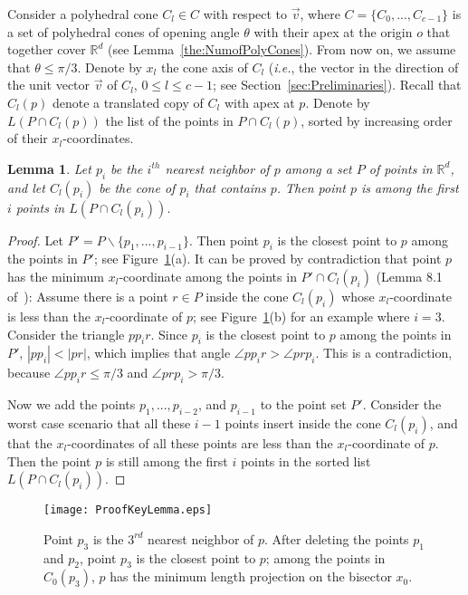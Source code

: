 \documentclass[preprint,12pt]{elsarticle}
\newcommand{\ie}{\emph{i.e.}}
\newtheorem{lemma}{Lemma}[section]
\begin{document}
Consider a polyhedral cone $C_l\in C$ with respect to $\overrightarrow{v}$, where  $C=\{C_0,...,C_{c-1}\}$ is a set of polyhedral cones of opening angle $\theta$ with their apex at the origin $o$ that together cover $\mathbb{R}^d$ (see Lemma~\ref{the:NumofPolyCones}). From now on, we assume that $\theta\leq \pi/3$. Denote by $x_l$ the cone axis of $C_l$ (\ie, the vector in the direction of the unit vector $\overrightarrow{v}$ of $C_l$, $0\leq l\leq c-1$; see Section~\ref{sec:Preliminaries}). Recall that $C_l(p)$ denote a translated copy of $C_l$ with apex at $p$. Denote by $L(P\cap C_l(p))$ the list of the points in $P\cap C_l(p)$, sorted by increasing order of their $x_l$-coordinates.

\begin{lemma}\label{the:keyLemma2}
Let $p_i$ be the $i^{th}$ nearest neighbor of $p$ among a set $P$ of points in $\mathbb{R}^d$, and let $C_{l}(p_i)$ be the cone of $p_i$ that contains $p$. Then point $p$ is among the first $i$ points in $L(P\cap C_l(p_i))$.
\end{lemma}
\begin{proof}
Let $P'=P\backslash \{p_1,...,p_{i-1}\}$. Then point $p_i$ is the closest point to $p$ among the points in $P'$; see Figure~\ref{fig:ProofKeyLemma}(a). It can be proved by contradiction that point $p$ has the minimum $x_l$-coordinate among the points in $P'\cap C_l(p_i)$ (Lemma 8.1 of~\cite{Agarwal:2008:KDD:1435375.1435379}): Assume there is a point $r\in P$ inside the cone $C_l(p_i)$ whose $x_l$-coordinate is less than the $x_l$-coordinate of $p$; see Figure~\ref{fig:ProofKeyLemma}(b) for an example where $i=3$. Consider the triangle $pp_ir$. Since $p_i$ is the closest point to $p$ among the points in $P'$, $|pp_i|<|pr|$, which implies that angle $\angle pp_ir>\angle prp_i$. This is a contradiction, because $\angle pp_ir\leq\pi/3$ and $\angle prp_i>\pi/3$.

Now we add the points $p_1,...,p_{i-2}$, and $p_{i-1}$  to the point set $P'$. Consider the worst case scenario that all these  $i-1$ points insert inside the cone $C_l(p_i)$, and that the $x_l$-coordinates of all these points are less than the $x_l$-coordinate of $p$. Then the point $p$ is still among the  first $i$ points in the sorted list  $L(P\cap C_l(p_i))$.
\end{proof}

\begin{figure}[h]
\centering
\texttt{[image: ProofKeyLemma.eps]}
\caption{Point $p_3$ is the $3^{rd}$ nearest neighbor of $p$. After deleting the points $p_1$ and $p_2$, point $p_3$ is the closest point to $p$; among the points in $C_0(p_3)$, $p$ has the minimum length projection on the bisector $x_0$.}
\label{fig:ProofKeyLemma}
\end{figure}
\end{document}
